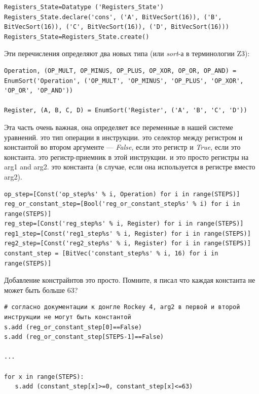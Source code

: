 \begin{lstlisting}
Registers_State=Datatype ('Registers_State')
Registers_State.declare('cons', ('A', BitVecSort(16)), ('B', BitVecSort(16)), ('C', BitVecSort(16)), ('D', BitVecSort(16)))
Registers_State=Registers_State.create()
\end{lstlisting}

Эти перечисления определяют два новых типа (или \textit{sort}-а в терминологии Z3):

\begin{lstlisting}
Operation, (OP_MULT, OP_MINUS, OP_PLUS, OP_XOR, OP_OR, OP_AND) = EnumSort('Operation', ('OP_MULT', 'OP_MINUS', 'OP_PLUS', 'OP_XOR', 'OP_OR', 'OP_AND'))

Register, (A, B, C, D) = EnumSort('Register', ('A', 'B', 'C', 'D'))
\end{lstlisting}

Эта часть очень важная, она определяет все переменные в нашей системе уравнений.
 это тип операции в инструкции.
 это селектор между регистром и константой во втором аргументе ---
\textit{False}, если это регистр и \textit{True}, если это константа.
 это регистр-приемник в этой инструкции.
 и  это просто регистры на arg1 and arg2. 
 это константа (в случае, если она используется в регистре вместо arg2).

\begin{lstlisting}
op_step=[Const('op_step%s' % i, Operation) for i in range(STEPS)]
reg_or_constant_step=[Bool('reg_or_constant_step%s' % i) for i in range(STEPS)]
reg_step=[Const('reg_step%s' % i, Register) for i in range(STEPS)]
reg1_step=[Const('reg1_step%s' % i, Register) for i in range(STEPS)]
reg2_step=[Const('reg2_step%s' % i, Register) for i in range(STEPS)]
constant_step = [BitVec('constant_step%s' % i, 16) for i in range(STEPS)]
\end{lstlisting}

Добавление констрайнтов это просто. Помните, я писал что каждая константа не может быть больше 63?

\begin{lstlisting}
# согласно документации к донгле Rockey 4, arg2 в первой и второй инструкции не могут быть константой
s.add (reg_or_constant_step[0]==False)
s.add (reg_or_constant_step[STEPS-1]==False)

...

for x in range(STEPS):
   s.add (constant_step[x]>=0, constant_step[x]<=63)
\end{lstlisting}

